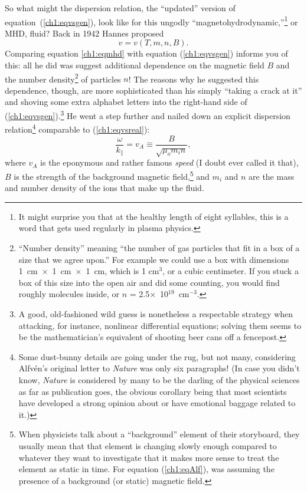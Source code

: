 So what might the dispersion relation, the ``updated'' version of
equation~(\ref{ch1:eqvsgen}), look like for this ungodly
``magnetohydrodynamic,''\footnote{It might surprise you that at the healthy
  length of eight syllables, this is a word that gets used regularly in plasma
  physics.} or MHD, fluid? Back in 1942 Hannes \Alf proposed
\begin{equation}
  \label{ch1:eqmhd}
  v = v ( T, m, n, B).
\end{equation}
Comparing equation \ref{ch1:eqmhd} with equation (\ref{ch1:eqvsgen}) informs you
of this: all he did was suggest additional dependence on the magnetic field $B$
and the number density\footnote{``Number density'' meaning ``the number of gas
  particles that fit in a box of a size that we agree upon.'' For example we
  could use a box with dimensions 1~cm~$\times$~1~cm~$\times$~1~cm, which is 1
  cm$^3$, or a cubic centimeter. If you stuck a box of this size into the open
  air and did some counting, you would find roughly
   molecules inside, or $n$ =
  2.5$\times$~10$^{19}$~cm$^{-3}$.} of particles $n$!  The reasons why he
suggested this dependence, though, are more sophisticated than his simply
``taking a crack at it'' and shoving some extra alphabet letters into the
right-hand side of (\ref{ch1:eqvsgen}).\footnote{A good, old-fashioned wild
  guess is nonetheless a respectable strategy when attacking, for instance,
  nonlinear differential equations; solving them seems to be the mathematician's
  equivalent of shooting beer cans off a fencepost.} He went a step further and
nailed down an explicit dispersion relation\footnote{Some dust-bunny details are
  going under the rug, but not many, considering Alfv\'{e}n's original letter to
  \textsl{Nature} was only six paragraphs! (In case you didn't know,
  \textsl{Nature} is considered by many to be the darling of the physical
  sciences as far as publication goes, the obvious corollary being that most
  scientists have developed a strong opinion about or have emotional baggage
  related to it.)} comparable to (\ref{ch1:eqvsreal}):
\begin{equation}
  \label{ch1:eqAlf}
  \dfrac{\omega}{k_\parallel} = v_A \equiv \frac{B}{\sqrt{\mu_o m_i n}},
\end{equation}
where $v_A$ is the eponymous and rather famous \textsl{\Alf speed} (I doubt \Alf
ever called it that), $B$ is the strength of the background magnetic
field,\footnote{When physicists talk about a ``background'' element of their
  storyboard, they usually mean that that element is changing slowly enough
  compared to whatever they want to investigate that it makes more sense to
  treat the element as static in time. For equation (\ref{ch1:eqAlf}), \Alf was
  assuming the presence of a background (or static) magnetic field.} and $m_i$
and $n$ are the mass and number density of the ions that make up the fluid.

